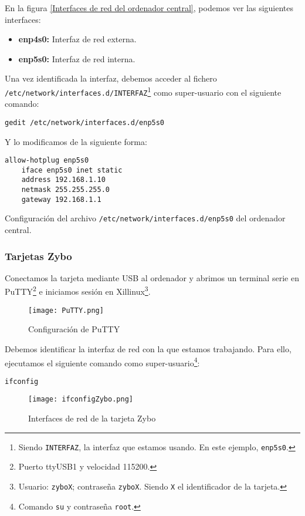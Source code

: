 \documentclass[12pt,letterpaper]{article}
\begin{document}
En la figura \ref{Interfaces de red del ordenador central}, podemos ver las siguientes interfaces:
\begin{itemize}
	\item \textbf{enp4s0:} Interfaz de red externa.
	\item \textbf{enp5s0:} Interfaz de red interna.
\end{itemize}

Una vez identificada la interfaz, debemos acceder al fichero\\ \texttt{/etc/network/interfaces.d/INTERFAZ}\footnote{Siendo \texttt{INTERFAZ}, la interfaz que estamos usando. En este ejemplo, \texttt{enp5s0}.} como super-usuario con el siguiente comando:
\begin{center}
	\texttt{gedit /etc/network/interfaces.d/enp5s0}
\end{center}
Y lo modificamos de la siguiente forma:
\begin{lstlisting}
allow-hotplug enp5s0
    iface enp5s0 inet static
    address 192.168.1.10
    netmask 255.255.255.0
    gateway 192.168.1.1
\end{lstlisting}
Configuración del archivo \texttt{/etc/network/interfaces.d/enp5s0} del ordenador central.

\newpage

\subsubsection{Tarjetas Zybo}
Conectamos la tarjeta mediante USB al ordenador y abrimos un terminal serie en PuTTY\footnote{Puerto ttyUSB1 y velocidad 115200.} e iniciamos sesión en Xillinux\footnote{Usuario: \texttt{zyboX}; contraseña \texttt{zyboX}. Siendo \texttt{X} el identificador de la tarjeta.}.

\begin{figure}[h]
	\centering
	\texttt{[image: PuTTY.png]}
	\caption{Configuración de PuTTY}
	\label{Configuración de PuTTY}
\end{figure}

Debemos identificar la interfaz de red con la que estamos trabajando. Para ello, ejecutamos el siguiente comando como super-usuario\footnote{Comando \texttt{su} y contraseña \texttt{root}.}:
\begin{center}
	\texttt{ifconfig}
\end{center}
\newpage
\begin{figure}[h]
	\centering
	\texttt{[image: ifconfigZybo.png]}
	\caption{Interfaces de red de la tarjeta Zybo}
	\label{Interfaces de red de la tarjeta Zybo}
\end{figure}
\end{document}
